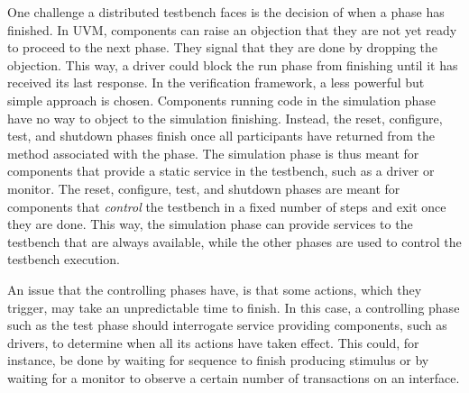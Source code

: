 One challenge a distributed testbench faces is the decision of when a phase has finished. In UVM, components can raise
an objection that they are not yet ready to proceed to the next phase. They signal that they are done by
dropping the objection. This way, a driver could block the run phase from finishing until it has
received its last response. In the verification framework, a less powerful but simple approach is chosen. Components
running code in the simulation phase have no way to object to the simulation finishing. Instead, the reset, configure,
test, and shutdown phases finish once all participants have returned from the method associated with the phase. The
simulation phase is thus meant for components that provide a static service in the testbench, such as a driver or
monitor. The reset, configure, test, and shutdown phases are meant for components that \textit{control} the testbench
in a fixed number of steps and exit once they are done. This way, the simulation phase can provide services
to the testbench that are always available, while the other phases are used to control the testbench execution.

An issue that the controlling phases have, is that some actions, which they trigger, may take an unpredictable time to
finish. In this case, a controlling phase such as the test phase should interrogate service providing components, such
as drivers, to determine when all its actions have taken effect. This could, for instance, be done by waiting for
sequence to finish producing stimulus or by waiting for a monitor to observe a certain number of transactions on an interface.



